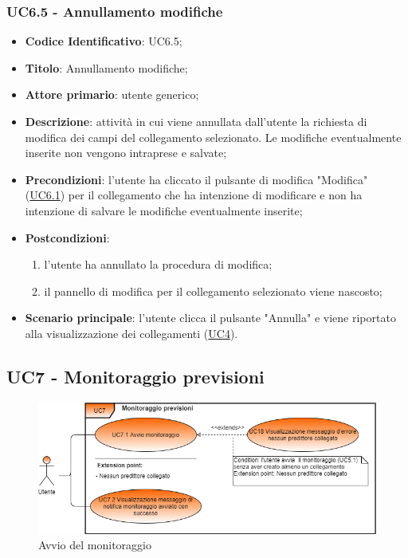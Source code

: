 	\subsubsection{UC6.5 - Annullamento modifiche}
		\begin{itemize}
			\item\textbf{Codice Identificativo}: UC6.5;
			\item\textbf{Titolo}: Annullamento modifiche;
			\item\textbf{Attore primario}: utente generico;
			\item\textbf{Descrizione}: attività in cui viene annullata dall'utente la richiesta di modifica dei campi del collegamento selezionato. Le modifiche eventualmente inserite non vengono intraprese e salvate;
			\item\textbf{Precondizioni}: l'utente ha cliccato il pulsante di modifica "Modifica" (\hyperref[par:UC6.1]{UC6.1}) per il collegamento che ha intenzione di modificare e non ha intenzione di salvare le modifiche eventualmente inserite;
			\item\textbf{Postcondizioni}: 	
			\begin{enumerate}
			\item l'utente ha annullato la procedura di modifica;
			\item il pannello di modifica per il collegamento selezionato viene nascosto;
			\end{enumerate}
			\item\textbf{Scenario principale}: l'utente clicca il pulsante "Annulla" e viene riportato alla visualizzazione dei collegamenti (\hyperref[par:UC4]{UC4}).
			\end{itemize}



	\label{par:UC7}
	\subsection{UC7 - Monitoraggio previsioni}

\begin{figure}[H]
		\centering
		\includegraphics[scale=0.70]{../Analisi_dei_requisiti/img/Diagrammi_UML/UC7_monitoraggio_previsioni.png}
		\caption{Avvio del monitoraggio} 
		\end{figure}	


